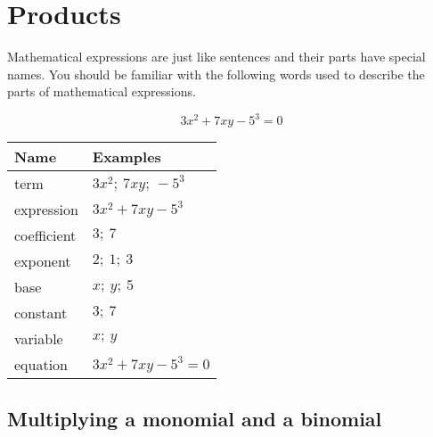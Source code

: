 \section{Products}
\setcounter{figure}{1}
\setcounter{subfigure}{1}
%   
\nopagebreak
Mathematical expressions are just like sentences and their parts have special names. You should be familiar with the following words used to describe the parts of  mathematical expressions.\par 

\begin{equation*}
3x^2 + 7xy - 5^3 = 0
\end{equation*}



\begin{table}[H]
\begin{center}
\begin{tabular}{|l|l|}
\hline
\textbf{Name} & \textbf{Examples} \\
\hline
term & $3x^2;~7xy;~-5^3$\\ \hline
expression & $3x^2 + 7xy -5^3$\\ \hline
coefficient & $3;~7$\\ \hline
exponent & $2;~1;~3$\\ \hline
base & $x;~y;~5$\\ \hline
constant & $3;~7$\\ \hline
variable & $x;~y$\\ \hline
equation & $3x^2 + 7xy -5^3 = 0$\\ \hline


\end{tabular}
\end{center}
\end{table} 

\par

\subsection*{Multiplying a monomial and a binomial}


